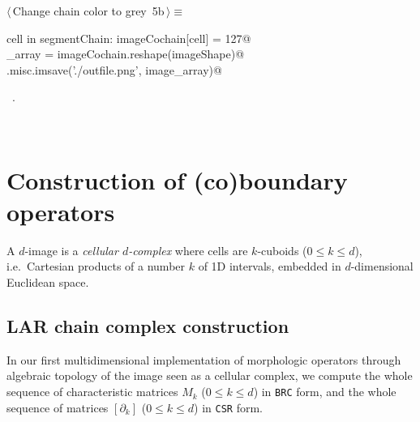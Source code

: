 \documentclass[11pt,oneside]{article}	%
\begin{document}
\begin{flushleft} \small
\begin{minipage}{\linewidth} \label{scrap8}
\protect{}$\langle\,$Change chain color to grey\nobreak\ {\footnotesize 5b}$\,\rangle\equiv$
\vspace{-1ex}
\begin{list}{}{} \item
\mbox{}\verb@for cell in segmentChain: imageCochain[cell] = 127@\\
\mbox{}\verb@image_array = imageCochain.reshape(imageShape)@\\
\mbox{}\verb@scipy.misc.imsave('./outfile.png', image_array)@\\
\mbox{}\verb@@{\NWsep}
\end{list}
\vspace{-1ex}
\footnotesize\addtolength{\baselineskip}{-1ex}
\begin{list}{}{\setlength{\itemsep}{-\parsep}\setlength{\itemindent}{-\leftmargin}}
\item \NWtxtMacroRefIn\ .
\end{list}
\end{minipage}\\[4ex]
\end{flushleft}


\section{Construction of (co)boundary operators}

A $d$-image is a \emph{cellular $d$-complex} where cells are $k$-cuboids ($0\leq k\leq d$), i.e.~Cartesian products of a number $k$ of 1D intervals, embedded in $d$-dimensional Euclidean space. 

\subsection{LAR chain complex construction}

In our first multidimensional implementation of morphologic operators through algebraic topology of the image seen as a cellular complex, we compute the whole sequence of characteristic matrices $M_k$ ($0\leq k \leq d$) in \texttt{BRC} form, and the whole sequence of matrices $[\partial_k]$ ($0\leq k \leq d$) in \texttt{CSR} form.
\end{document}
